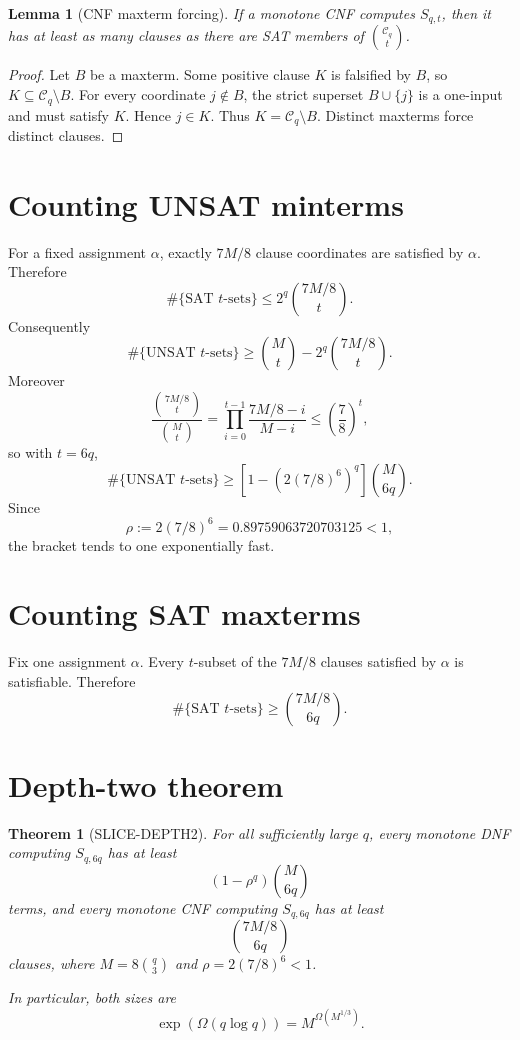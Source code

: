 \documentclass[11pt]{article}
\newtheorem{theorem}{Theorem}
\newtheorem{lemma}{Lemma}
\begin{document}
\begin{lemma}[CNF maxterm forcing]
If a monotone CNF computes \(S_{q,t}\), then it has at least as many clauses
as there are SAT members of \(\binom{\mathcal C_q}{t}\).
\end{lemma}

\begin{proof}
Let \(B\) be a maxterm.  Some positive clause \(K\) is falsified by \(B\), so
\(K\subseteq\mathcal C_q\setminus B\).  For every coordinate
\(j\notin B\), the strict superset \(B\cup\{j\}\) is a one-input and must
satisfy \(K\).  Hence \(j\in K\).  Thus
\(K=\mathcal C_q\setminus B\).  Distinct maxterms force distinct clauses.
\end{proof}

\section{Counting UNSAT minterms}

For a fixed assignment \(\alpha\), exactly \(7M/8\) clause coordinates are
satisfied by \(\alpha\).  Therefore
\[
\#\{\text{SAT }t\text{-sets}\}
\le
2^q\binom{7M/8}{t}.
\]
Consequently
\[
\#\{\text{UNSAT }t\text{-sets}\}
\ge
\binom Mt
-
2^q\binom{7M/8}{t}.
\]
Moreover
\[
\frac{\binom{7M/8}{t}}{\binom Mt}
=
\prod_{i=0}^{t-1}
\frac{7M/8-i}{M-i}
\le
\left(\frac78\right)^t,
\]
so with \(t=6q\),
\[
\#\{\text{UNSAT }t\text{-sets}\}
\ge
\left[
1-\left(2(7/8)^6\right)^q
\right]\binom M{6q}.
\]
Since
\[
\rho:=2(7/8)^6=0.89759063720703125<1,
\]
the bracket tends to one exponentially fast.

\section{Counting SAT maxterms}

Fix one assignment \(\alpha\).  Every \(t\)-subset of the \(7M/8\) clauses
satisfied by \(\alpha\) is satisfiable.  Therefore
\[
\#\{\text{SAT }t\text{-sets}\}
\ge
\binom{7M/8}{6q}.
\]

\section{Depth-two theorem}

\begin{theorem}[SLICE-DEPTH2]
For all sufficiently large \(q\), every monotone DNF computing
\(S_{q,6q}\) has at least
\[
\left(1-\rho^q\right)\binom M{6q}
\]
terms, and every monotone CNF computing \(S_{q,6q}\) has at least
\[
\binom{7M/8}{6q}
\]
clauses, where \(M=8\binom q3\) and
\(\rho=2(7/8)^6<1\).

In particular, both sizes are
\[
\exp(\Omega(q\log q))
=
M^{\Omega(M^{1/3})}.
\]
\end{theorem}
\end{document}
